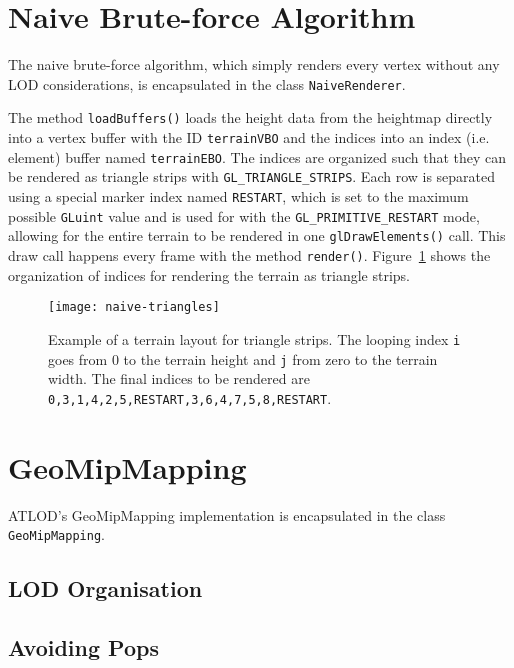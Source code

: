 \section{Naive Brute-force Algorithm}
The naive brute-force algorithm, which simply renders every vertex without any LOD considerations, is encapsulated in the class \texttt{NaiveRenderer}.

The method \texttt{loadBuffers()} loads the height data from the heightmap directly into a vertex buffer with the ID \texttt{terrainVBO} and the indices into an index (i.e. element) buffer named \texttt{terrainEBO}.
The indices are organized such that they can be rendered as triangle strips with \texttt{GL\_TRIANGLE\_STRIPS}.
Each row is separated using a special marker index named \texttt{RESTART}, which is set to the maximum possible \texttt{GLuint} value and is used for with the \texttt{GL\_PRIMITIVE\_RESTART} mode,
allowing for the entire terrain to be rendered in one \texttt{glDrawElements()} call. This draw call happens every frame with the 
method \texttt{render()}. Figure~\ref{fig:naive-triangles} shows the organization of indices for rendering the terrain as triangle strips.

\begin{figure}[H]
  \centering
  \texttt{[image: naive-triangles]}
  \caption{Example of a terrain layout for triangle strips. The looping index \texttt{i} goes from 0 to the terrain height and \texttt{j} from zero to the terrain width. The final indices to be rendered are \texttt{0,3,1,4,2,5,RESTART,3,6,4,7,5,8,RESTART}.}\label{fig:naive-triangles}
\end{figure}

\section{GeoMipMapping}
ATLOD's GeoMipMapping implementation is encapsulated in the class \texttt{GeoMipMapping}.

\subsection{LOD Organisation}

\subsection{Avoiding Pops}

